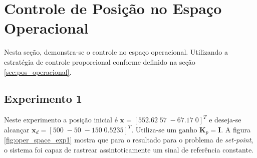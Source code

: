 \section{Controle de Posição no Espaço Operacional}

Nesta seção, demonstra-se o controle no espaço operacional. Utilizando a estratégia de controle proporcional conforme definido na seção \ref{sec:pos_operacional}. 

\subsection{Experimento 1}

Neste experimento a posição inicial é $\bm{x} =[ 552.62 \; 57 \; -67.17 \; 0]^T$ e deseja-se alcançar $\bm{x}_d =[ 500 \; -50 \; -150 \; 0.5235]^T$. Utiliza-se um ganho $\bm{K}_p = \bm{I}$. A figura \ref{fig:oper_space_exp1} mostra que para o resultado para o problema de \textit{set-point}, o sistema foi capaz de rastrear assintoticamente um sinal de referência constante. 


